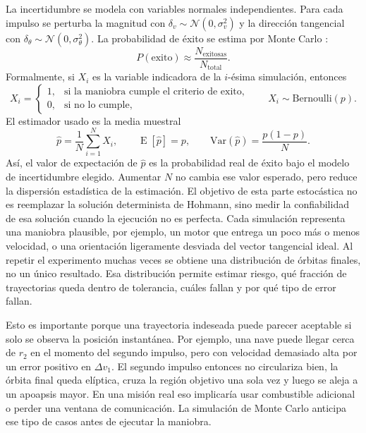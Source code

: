 \documentclass[12pt]{article}
\begin{document}
La incertidumbre se modela con variables normales independientes. Para cada
impulso se perturba la magnitud con
$\delta_v\sim\mathcal N(0,\sigma_v^2)$ y la dirección tangencial con
$\delta_\theta\sim\mathcal N(0,\sigma_\theta^2)$. La probabilidad de éxito se
estima por Monte Carlo \cite{metropolis1949}:
\begin{equation}
  P(\text{exito}) \approx \frac{N_{\text{exitosas}}}{N_{\text{total}}}.
\end{equation}
Formalmente, si $X_i$ es la variable indicadora de la $i$-ésima simulación,
entonces
\begin{equation}
  X_i =
  \begin{cases}
    1, & \text{si la maniobra cumple el criterio de exito},\\
    0, & \text{si no lo cumple},
  \end{cases}
  \qquad X_i\sim\mathrm{Bernoulli}(p).
\end{equation}
El estimador usado es la media muestral
\begin{equation}
  \hat p=\frac{1}{N}\sum_{i=1}^{N}X_i, \qquad
  \operatorname{E}[\hat p]=p, \qquad
  \mathrm{Var}(\hat p)=\frac{p(1-p)}{N}.
\end{equation}
Así, el valor de expectación de $\hat p$ es la probabilidad real de éxito bajo
el modelo de incertidumbre elegido. Aumentar $N$ no cambia ese valor esperado,
pero reduce la dispersión estadística de la estimación.
El objetivo de esta parte estocástica no es reemplazar la solución determinista
de Hohmann, sino medir la confiabilidad de esa solución cuando la ejecución no
es perfecta. Cada simulación representa una maniobra plausible, por ejemplo, un motor que
entrega un poco más o menos velocidad, o una orientación ligeramente desviada
del vector tangencial ideal. Al repetir el experimento muchas veces se obtiene
una distribución de órbitas finales, no un único resultado. Esa distribución
permite estimar riesgo, qué fracción de trayectorias queda dentro de tolerancia,
cuáles fallan y por qué tipo de error fallan.

Esto es importante porque una trayectoria indeseada puede parecer aceptable si
solo se observa la posición instantánea. Por ejemplo, una nave puede llegar
cerca de $r_2$ en el momento del segundo impulso, pero con velocidad demasiado
alta por un error positivo en $\Delta v_1$. El segundo impulso entonces no
circulariza bien, la órbita final queda elíptica, cruza la región objetivo una
sola vez y luego se aleja a un apoapsis mayor. En una misión real eso implicaría
usar combustible adicional o perder una ventana de comunicación.
La simulación de Monte Carlo anticipa ese tipo de casos antes de ejecutar la maniobra.
\end{document}
